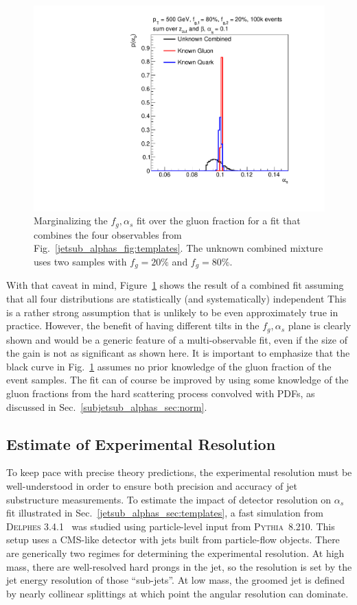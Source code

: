 \documentclass[11pt]{cernrep}
\begin{document}
\begin{figure}[t]
\begin{center}
\includegraphics[width = 0.49\columnwidth]{jetsub_alphas_combination23451324.pdf}
\end{center}
\caption{Marginalizing the $f_g,\alpha_s$ fit over the gluon fraction for a fit that combines the four observables from Fig.~\ref{jetsub_alphas_fig:templates}.  The unknown combined mixture uses two samples with $f_g=20\%$ and $f_g=80\%$.}
\label{jetsub_alphas_fig:combo}
\end{figure}

With that caveat in mind, Figure~\ref{jetsub_alphas_fig:combo} shows the result of a combined fit assuming that all four distributions are statistically (and systematically) independent
%
This is a rather strong assumption that is unlikely to be even approximately true in practice.
%
However, the benefit of having different tilts in the $f_g,\alpha_s$ plane is clearly shown and would be a generic feature of a multi-observable fit, even if the size of the gain is not as significant as shown here.
%
It is important to emphasize that the black curve in Fig.~\ref{jetsub_alphas_fig:combo} assumes no prior knowledge of the gluon fraction of the event samples.
%
The fit can of course be improved by using some knowledge of the gluon fractions from the hard scattering process convolved with PDFs, as discussed in Sec.~\ref{subjetsub_alphas_sec:norm}.

\subsection{Estimate of Experimental Resolution}
\label{jetsub_alphas_sec:resolution}

To keep pace with precise theory predictions, the experimental resolution must be well-understood in order to ensure both precision and accuracy of jet substructure measurements.
%
To estimate the impact of detector resolution on $\alpha_s$ fit illustrated in Sec.~\ref{jetsub_alphas_sec:templates}, a fast simulation from \textsc{Delphes} 3.4.1~\cite{deFavereau:2013fsa} was studied using particle-level input from \textsc{Pythia~8}.210.
%
This setup uses a CMS-like detector with jets built from particle-flow objects.
%
There are generically two regimes for determining the experimental resolution.
%
At high mass, there are well-resolved hard prongs in the jet, so the resolution is set by the jet energy resolution of those ``sub-jets''.
%
At low mass, the groomed jet is defined by nearly collinear splittings at which point the angular resolution can dominate.
\end{document}
